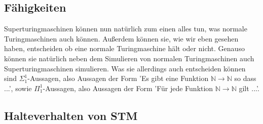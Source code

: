 \documentclass{scrartcl}
\begin{document}
\subsection{Fähigkeiten}
Superturingmaschinen können nun natürlich zum einen alles tun, was normale
Turingmaschinen auch können. Außerdem können sie, wie wir eben gesehen haben,
entscheiden ob eine normale Turingmaschine hält oder nicht. Genauso können sie
natürlich neben dem Simulieren von normalen Turingmaschinen auch
Superturingmaschinen simulieren. Was sie allerdings auch entscheiden können
sind $\Sigma_1^1$-Aussagen, also Aussagen der Form 'Es gibt eine Funktion
$\mathbb{N} \rightarrow \mathbb{N}$ so dass ...', sowie $\Pi^1_1$-Aussagen,
also Aussagen der Form 'Für jede Funktion $\mathbb{N} \rightarrow \mathbb{N}$
gilt ...'. 


\subsection{Halteverhalten von STM}
\end{document}
